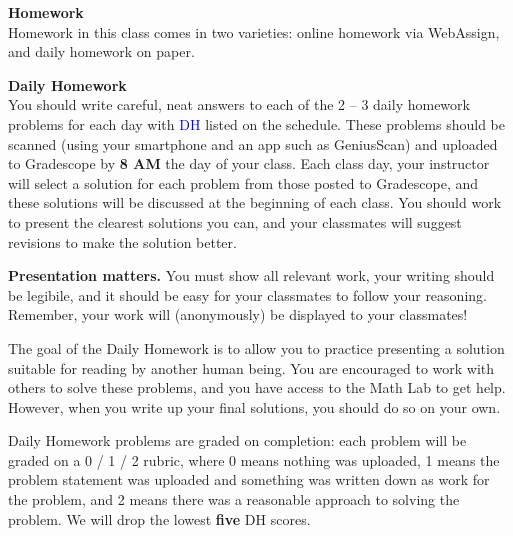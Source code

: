 \documentclass[12pt]{article}
\renewcommand{\emph}[1]{\textsf{\textbf{#1}}}
\newcommand{\localhead}[1]{\par\smallskip\textbf{#1}\nobreak\\}%
\def\heading#1{\localhead{\large\emph{#1}}}
\def\subheading#1{\localhead{\emph{#1}}}
\begin{document}
\heading{Homework}
Homework in this class comes in two varieties: online homework via WebAssign, and daily homework on paper. %

\subheading{Daily Homework}
You should write careful, neat answers to each of the 2 -- 3 daily homework problems for each day with \textcolor{blue}{DH} listed on the schedule. These problems should be scanned (using your smartphone and an app such as GeniusScan) and uploaded to Gradescope by {\bf 8 AM} the day of your class. Each class day, your instructor will select a solution for each problem from those posted to Gradescope, and these solutions will be discussed at the beginning of each class. You should work to present the clearest solutions you can, and your classmates will suggest revisions to make the solution better. 

\emph{Presentation matters.} You must show all relevant work, your writing
should be legibile, and it should be easy for your classmates to follow
your reasoning. Remember, your work will (anonymously) be displayed to your classmates!

The goal of the Daily Homework is to allow you to practice presenting 
 a solution suitable for reading by another human being.  You are 
encouraged to work with others to solve these problems, and you 
have access to the Math Lab to get help.  However, when you 
write up your final solutions, you should do so on your own. 

Daily Homework problems are graded on completion: each problem will be graded on a 0 / 1 / 2 rubric, where 0 means nothing was uploaded, 1 means the problem statement was uploaded and something was written down as work for the problem, and 2 means there was a reasonable approach to solving the problem. We will drop the lowest {\bf five} DH scores.


\end{document}
